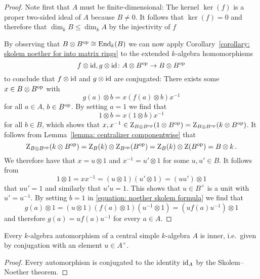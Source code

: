 \begin{proof}
  Note first that $A$ must be finite-dimensional:
  The kernel $\ker(f)$ is a proper two-sided ideal of $A$ because $B \neq 0$.
  It follows that $\ker(f) = 0$ and therefore that $\dim_k B \leq \dim_k A$ by the injectivity of $f$
  
  By observing that $B \otimes B^{\mathrm{op}} \cong \operatorname{End}_k(B)$ we can now apply Corollary~\ref{corollary: skolem noether for into matrix rings} to the extended $k$-algebra homomorphisms
  \[
            f \otimes \operatorname{id}, g \otimes \operatorname{id}
    \colon  A \otimes B^{\mathrm{op}}
    \to     B \otimes B^{\mathrm{op}}
  \]
  to conclude that $f \otimes \operatorname{id}$ and $g \otimes \operatorname{id}$ are conjugated:
  There exists some $x \in B \otimes B^{\mathrm{op}}$ with
  \begin{equation}
    \label{equation: noether skolem formula}
      g(a) \otimes b
    = x ( f(a) \otimes b ) x^{-1}
  \end{equation}
  for all $a \in A$, $b \in B^{\mathrm{op}}$.
  By setting $a = 1$ we find that
  \[
      1 \otimes b
    = x (1 \otimes b) x^{-1}
  \]
  for all $b \in B$, which shows that $x, x^{-1} \in \operatorname{Z}_{B \otimes B^{\mathrm{op}}}(1 \otimes B^{\mathrm{op}}) = \operatorname{Z}_{B \otimes B^{\mathrm{op}}}(k \otimes B^{\mathrm{op}})$.
  It follows from Lemma~\ref{lemma: centralizer componentwise} that
  \[
      \operatorname{Z}_{B \otimes B^{\mathrm{op}}}(k \otimes B^{\mathrm{op}})
    = \operatorname{Z}_{B}(k) \otimes \operatorname{Z}_{B^{\mathrm{op}}}(B^{\mathrm{op}})
    = \operatorname{Z}_{B}(k) \otimes \operatorname{Z}(B^{\mathrm{op}})
    = B \otimes k \,.
  \]
  We therefore have that $x = u \otimes 1$ and $x^{-1} = u' \otimes 1$ for some $u, u' \in B$.
  It follows from
  \[
      1 \otimes 1
    = x x^{-1}
    = (u \otimes 1) (u' \otimes 1)
    = (u u') \otimes 1
  \]
  that $u u' = 1$ and similarly that $u' u = 1$.
  This shows that $u \in B^\times$ is a unit with $u' = u^{-1}$.
  By setting $b = 1$ in \eqref{equation: noether skolem formula} we find that
  \[
      g(a) \otimes 1
    = (u \otimes 1) (f(a) \otimes 1) (u^{-1} \otimes 1)
    = (u f(a) u^{-1}) \otimes 1
  \]
  and therefore $g(a) = u f(a) u^{-1}$ for every $a \in A$.
\end{proof}


\begin{corollary}
  Every $k$-algebra automorphism of a central simple $k$-algebra $A$ is inner, i.e.\ given by conjugation with an element $u \in A^\times$.
\end{corollary}


\begin{proof}
  Every automorphism is conjugated to the identity $\operatorname{id}_A$ by the Skolem--Noether theorem.
\end{proof}




